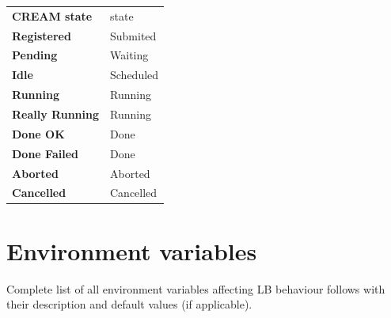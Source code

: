 \begin{tabularx}{\textwidth}{>{\bfseries}lX}
CREAM state 	& \LB state \\
Registered	& Submited \\
Pending 	& Waiting \\
Idle		& Scheduled \\
Running		& Running \\
Really Running	& Running \\
Done OK		& Done \\
Done Failed	& Done \\
Aborted		& Aborted \\
Cancelled	& Cancelled \\
\end{tabularx}

\newpage
\section{Environment variables}
\label{a:environment}

Complete list of all environment variables affecting LB behaviour follows with 
their description and default values (if applicable).


